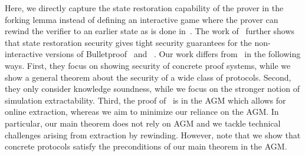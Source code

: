 Here, we directly capture the state restoration capability of the prover in the forking lemma instead of defining an interactive game where the prover can rewind the verifier to an earlier state as is done in~\cite{C:GhoTes21}. 
The work of~\cite{C:GhoTes21} further shows that state restoration security gives tight security guarantees for the
non-interactive versions of Bulletproof~\cite{SP:BBBPWM18} and \sonic~. 
Our work differs from~\cite{C:GhoTes21} in the following ways. First, they
focus on showing security of concrete proof systems, while we show
a general theorem about the security of a wide class of protocols. 
Second, they only consider knowledge soundness, while we focus on the stronger notion of simulation extractability. Third, the proof of~\cite{C:GhoTes21} is in the AGM which allows for online extraction, whereas we aim to minimize our reliance on the AGM. In particular, our main theorem does not rely on AGM and we tackle technical challenges arising from extraction by rewinding. 
However, note that we show that concrete protocols satisfy the preconditions of our main theorem in the AGM.

